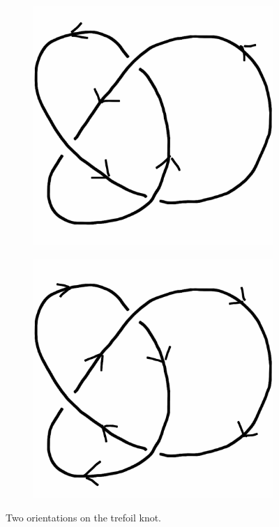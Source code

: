 \documentclass[12pt,letterpaper]{article}
\theoremstyle{definition}
\begin{document}
\begin{figure}[h]
    \centering
    \begin{subfigure}{.3\textwidth}
        \centering
        \includegraphics[width=\textwidth]{rgp11pics/trefoil-forward.png}
    \end{subfigure}
    \hspace{1cm}
    \begin{subfigure}{.3\textwidth}
        \centering         
        \includegraphics[width=\textwidth]{rgp11pics/trefoil-reverse.png}
    \end{subfigure}
    \caption{Two orientations on the trefoil knot.}
\end{figure}
\end{document}
